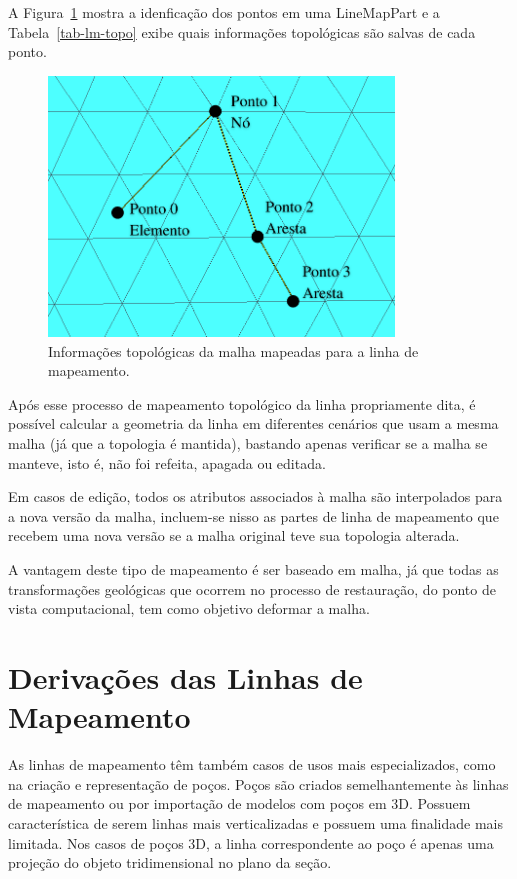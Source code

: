 A Figura~\ref{fig-lm-topo} mostra a idenficação dos pontos em uma LineMapPart e a Tabela~\ref{tab-lm-topo} exibe quais informações topológicas são salvas de cada ponto.

\begin{figure} [hbt!]
  \begin{center}
    \includegraphics[width=260pt]{images/fig-lm-topo}
    \caption{Informações topológicas da malha mapeadas para a linha de mapeamento.}\label{fig-lm-topo}
  \end{center}
\end{figure}



Após esse processo de mapeamento topológico da linha propriamente dita, é possível calcular a geometria da linha em diferentes cenários que usam a mesma malha (já que a topologia é mantida), bastando apenas verificar se a malha se manteve, isto é, não foi refeita, apagada ou editada.

Em casos de edição, todos os atributos associados à malha são interpolados para a nova versão da malha, incluem-se nisso as partes de linha de mapeamento que recebem uma nova versão se a malha original teve sua topologia alterada.

A vantagem deste tipo de mapeamento é ser baseado em malha, já que todas as transformações geológicas que ocorrem no processo de restauração, do ponto de vista computacional, tem como objetivo deformar a malha.

\section{Derivações das Linhas de Mapeamento}

As linhas de mapeamento têm também casos de usos mais especializados, como na criação e representação de poços. Poços são criados semelhantemente às linhas de mapeamento ou por importação de modelos com poços em 3D. Possuem característica de serem linhas mais verticalizadas e possuem uma finalidade mais limitada. Nos casos de poços 3D, a linha correspondente ao poço é apenas uma projeção do objeto tridimensional no plano da seção.

